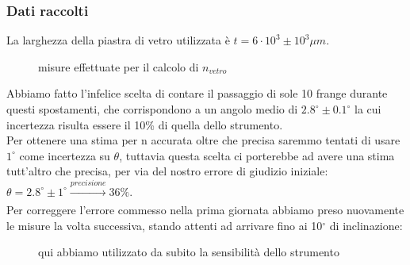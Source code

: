 \documentclass{article}
\theoremstyle{definition}
\begin{document}
\subsubsection{Dati raccolti}
La larghezza della piastra di vetro utilizzata è \(t = 6 \cdot 10^{3} \pm 10^{3}  \mu m\).\\

\begin{figure}[!htbp]
    	\captionsetup{labelformat=empty}
    	\caption{misure effettuate per il calcolo di $n_{vetro}$}
    \end{figure}
    
\noindent Abbiamo fatto l'infelice scelta di contare il passaggio di sole 10 frange durante questi spostamenti, che corrispondono a un angolo medio di $2.8^{\circ} \pm 0.1^{\circ}$ la cui incertezza risulta essere il 10\% di quella dello strumento.\\
Per ottenere una stima per n accurata oltre che precisa saremmo tentati di usare \(1^{\circ}\) come incertezza su \(\theta\), tuttavia questa scelta ci porterebbe ad avere una stima tutt'altro che precisa, per via del nostro errore di giudizio iniziale: \(\theta = 2.8^{\circ} \pm 1^{\circ} \xrightarrow[]{precisione} 36\% \). \\

Per correggere l'errore commesso nella prima giornata abbiamo preso nuovamente le misure la volta successiva, stando attenti ad arrivare fino ai 10$^{\circ}$ di inclinazione:\\
\begin{figure}[!htbp]
    	\captionsetup{labelformat=empty}
             \caption{qui abbiamo utilizzato da subito la sensibilità dello strumento}
    \end{figure}
\end{document}
